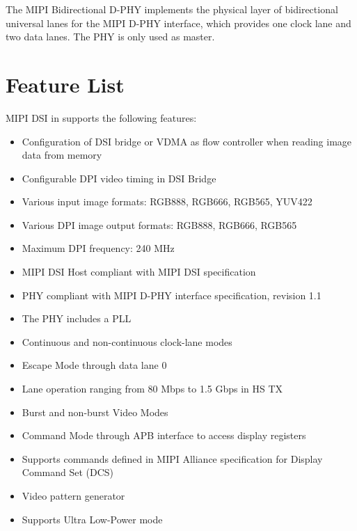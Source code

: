 \documentclass[main\_\_EN.tex]{subfiles}
\begin{document}
The MIPI Bidirectional D-PHY implements the physical layer of bidirectional universal lanes for the MIPI D-PHY interface, which provides one clock lane and two data lanes. The PHY is only used as master.






\section{Feature List}
\label{sec:mipidsi-features}

MIPI DSI in \chipname{} supports the following features:
\begin{itemize}
    \item Configuration of DSI bridge or VDMA as flow controller when reading image data from memory
    \item Configurable DPI video timing in DSI Bridge
    \item Various input image formats: RGB888, RGB666, RGB565, YUV422
    \item Various DPI image output formats: RGB888, RGB666, RGB565
    \item Maximum DPI frequency: 240 MHz
    \item MIPI DSI Host compliant with MIPI DSI specification
    \item PHY compliant with MIPI D-PHY interface specification, revision 1.1
    \item The PHY includes a PLL
    \item Continuous and non-continuous clock-lane modes
    \item Escape Mode through data lane 0
    \item Lane operation ranging from 80 Mbps to 1.5 Gbps in HS TX
    \item Burst and non-burst Video Modes
    \item Command Mode through APB interface to access display registers
    \item Supports commands defined in MIPI Alliance specification for Display Command Set (DCS)
    \item Video pattern generator
    \item Supports Ultra Low-Power mode
\end{itemize}


\end{document}
